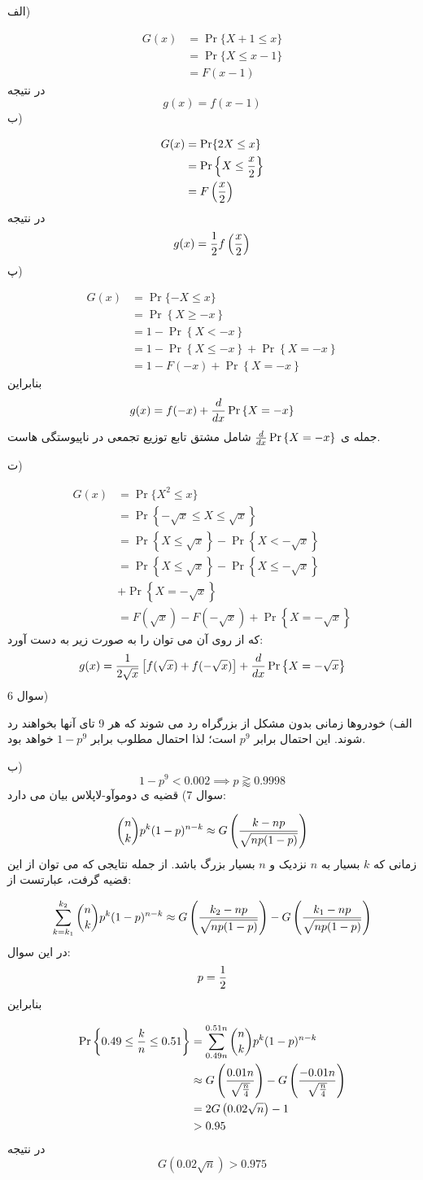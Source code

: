 \documentclass[10pt,letterpaper]{report}
\newcommand{\eqn}[1]{
\[\begin{split}
#1
\end{split}\]
}
\begin{document}
الف)
\eqn{
G(x)&=\Pr\{X+1\le x\}
\\&=\Pr\{X\le x-1\}
\\&=F(x-1)
}{}
در نتیجه
$$
g(x)=f(x-1)
$$
ب)
\eqn{
G(x)&=\Pr\{2X\le x\}
\\&=\Pr\left\{X\le {x\over 2}\right\}
\\&=F\left({x\over 2}\right)
}{}
در نتیجه
$$
g(x)={1\over 2}f\left({x\over 2}\right)
$$
پ)
\eqn{
G(x)&=\Pr\{-X\le x\}
\\&=\Pr\left\{X\ge -x\right\}
\\&=1-\Pr\left\{X< -x\right\}
\\&=1-\Pr\left\{X\le-x\right\}+\Pr\left\{X=-x\right\}
\\&=1-F(-x)+\Pr\left\{X=-x\right\}
}{}
بنابراین
$$
g(x)=f(-x)+{d\over dx}\Pr\left\{X=-x\right\}
$$
جمله ی ${d\over dx}\Pr\left\{X=-x\right\}$ شامل مشتق تابع توزیع تجمعی در ناپیوستگی هاست.

ت)
\eqn{
G(x)&=\Pr\{X^2\le x\}
\\&=\Pr\left\{-\sqrt x\le X\le \sqrt x\right\}
\\&=\Pr\left\{X\le \sqrt x\right\}-\Pr\left\{X<-\sqrt x\right\}
\\&=\Pr\left\{X\le \sqrt x\right\}-\Pr\left\{X\le-\sqrt x\right\}
\\&+\Pr\left\{X=-\sqrt x\right\}
\\&=F(\sqrt x)-F(-\sqrt x)+\Pr\left\{X=-\sqrt x\right\}
}{}
که از روی آن می توان  را به صورت زیر به دست آورد:
$$
g(x)={1\over 2\sqrt x}\left[f(\sqrt x)+f(-\sqrt x)\right]+{d\over dx}\Pr\left\{X=-\sqrt x\right\}
$$
سوال 6)

الف) خودروها زمانی بدون مشکل از بزرگراه رد می شوند که هر 9 تای آنها بخواهند رد شوند. این احتمال برابر $p^9$ است؛ لذا احتمال مطلوب برابر $1-p^9$ خواهد بود.

ب) 
$$
1-p^9<0.002\implies p\gtrapprox 0.9998
$$
سوال 7) قضیه ی دوموآو-لاپلاس بیان می دارد:
\eqn{
\binom{n}{k}p^k(1-p)^{n-k}\approx G\left({k-np\over\sqrt{np(1-p)}}\right)
}{}
زمانی که $k$ بسیار به $n$ نزدیک و $n$ بسیار بزرگ باشد. از جمله نتایجی که می توان از این قضیه گرفت، عبارتست از:
\eqn{
\sum_{k=k_1}^{k_2}\binom{n}{k}p^k(1-p)^{n-k}\approx
G\left({k_2-np\over\sqrt{np(1-p)}}\right)
-
G\left({k_1-np\over\sqrt{np(1-p)}}\right)
}{}
در این سوال:
$$
p={1\over 2}
$$
بنابراین
\eqn{
\Pr\left\{0.49\le{k\over n}\le0.51\right\}&=
\sum_{0.49n}^{0.51n}\binom{n}{k}p^k(1-p)^{n-k}
\\&\approx
G\left({0.01n\over\sqrt{n\over 4}}\right)
-
G\left({-0.01n\over\sqrt{n\over 4}}\right)
\\&=
2G\left({0.02\sqrt n}\right)-1
\\&>0.95
}{}
در نتیجه
$$
G\left({0.02\sqrt n}\right)>0.975
$$
\end{document}
